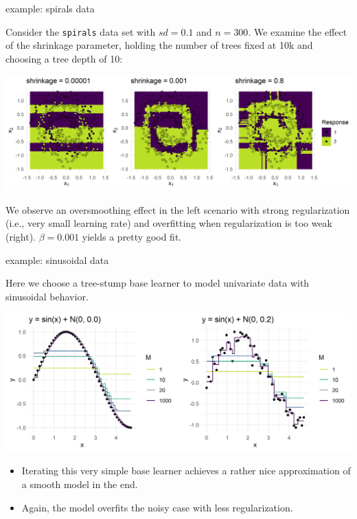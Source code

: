 \begin{vbframe}{example: spirals data}

Consider the \texttt{spirals} data set with $\mathit{sd} = 0.1$ and $n = 300$.
We examine the effect of the shrinkage parameter, holding the number of trees
fixed at 10k and choosing a tree depth of 10:

\vfill

\includegraphics[width = \textwidth]{figure/gbm_regu_oversmoothing_overfitting}

\vfill

We observe an oversmoothing effect in the left scenario with strong
regularization (i.e., very small learning rate) and overfitting when
regularization is too weak (right). $\beta = 0.001$  yields a pretty good fit.

\end{vbframe}


\begin{vbframe}{example: sinusoidal data}

Here we choose a tree-stump base learner to model univariate data
with sinusoidal behavior.


\begin{center}
  \includegraphics[width=\textwidth]{figure/gbm_sine.png}
\end{center}


\small
\begin{itemize}
  \item Iterating this very simple base learner achieves a rather nice
  approximation of a smooth model in the end.
  \item Again, the model overfits the noisy case with less
  regularization.
\end{itemize}

\end{vbframe}

\endlecture

